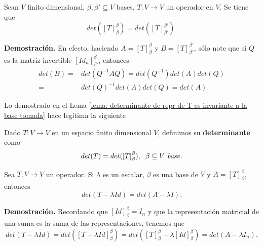 \begin{lema}
	\label{lema: determinante de repr de T es invariante a la base tomada}
	Sean $V$ finito dimensional, $\beta, \beta' \subseteq V$ bases,
	$T: V \longrightarrow V$ un operador en $V$.
	Se tiene que
	\[
	det([T]_{\beta}^{\beta}) = det([T]_{\beta'}^{\beta'}).
	\]
\end{lema}
\noindent
\textbf{Demostración.}
En efecto, haciendo
$A = [T]_{\beta}^{\beta}$ y $B = [T]_{\beta'}^{\beta'}$,
sólo note que si $Q$ es la matriz invertible $[Id_{n}]_{\beta'}^{\beta}$,
entonces
\begin{align*}
det(B) = & det(Q^{-1} A Q) = det(Q^{-1}) det(A) det(Q) \\
= & det(Q)^{-1} det(A) det(Q) = det(A).
\end{align*}

\QEDB
\vspace{0.2cm}

Lo demostrado en el Lema
\ref{lema: determinante de repr de T es invariante a la base tomada}
hace legítima la siguiente
\begin{defi}
	\label{def: determinante de un operador}
	Dado $T: V \longrightarrow V$ en un espacio finito dimensional $V$,
	definimos su \textbf{determinante} como 
	\[
	det(T) = det([T]_{\beta}^{\beta}), \hspace{0.2cm}
	\beta \subseteq V \textit{ base.}
	\]
\end{defi}
\noindent

\begin{lema}
Sea $T: V \longrightarrow V$ un operador. Si $\lambda$ es un escalar,
$\beta$ es una base de $V$ y $A = [T]_{\beta}^{\beta}$, entonces
\begin{equation}
	\label{eq: det T - lambda I det A - lambda I}
	det(T - \lambda Id) = det(A - \lambda I).
\end{equation}
\end{lema}
\noindent
\textbf{Demostración.}
Recordando que $[Id]_{\beta}^{\beta} = I_{n}$ y que la representación
matricial de una suma es la suma de las representaciones, tenemos que
\[
det(T - \lambda Id) = det([T - \lambda Id]_{\beta}^{\beta}) 
= det([T]_{\beta}^{\beta} - \lambda[Id]_{\beta}^{\beta})
= det(A - \lambda I_{n}).
\]

\QEDB
\vspace{0.2cm}


